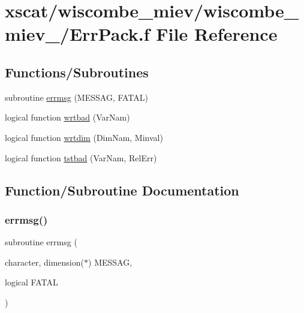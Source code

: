 \hypertarget{wiscombe__miev_2wiscombe__miev__1_2_err_pack_8f}{}\section{xscat/wiscombe\+\_\+miev/wiscombe\+\_\+miev\+\_/\+Err\+Pack.f File Reference}
\label{wiscombe__miev_2wiscombe__miev__1_2_err_pack_8f}
\subsection*{Functions/\+Subroutines}
\begin{DoxyCompactItemize}
\item 
subroutine \hyperlink{wiscombe__miev_2wiscombe__miev__1_2_err_pack_8f_a5b228fa8b6f6dd90e6de7beb661002ff}{errmsg} (M\+E\+S\+S\+AG, F\+A\+T\+AL)
\item 
logical function \hyperlink{wiscombe__miev_2wiscombe__miev__1_2_err_pack_8f_a39b9b11ebe066217c5eb36dda9009bab}{wrtbad} (Var\+Nam)
\item 
logical function \hyperlink{wiscombe__miev_2wiscombe__miev__1_2_err_pack_8f_ac00ea4bd5d2336abbbfaa44c3822eaad}{wrtdim} (Dim\+Nam, Minval)
\item 
logical function \hyperlink{wiscombe__miev_2wiscombe__miev__1_2_err_pack_8f_a17579d06a5cb7a305570f7082e20d81c}{tstbad} (Var\+Nam, Rel\+Err)
\end{DoxyCompactItemize}


\subsection{Function/\+Subroutine Documentation}
\mbox{\label{wiscombe__miev_2wiscombe__miev__1_2_err_pack_8f_a5b228fa8b6f6dd90e6de7beb661002ff}} 
\subsubsection{\texorpdfstring{errmsg()}{errmsg()}}
{\footnotesize\ttfamily subroutine errmsg (\begin{DoxyParamCaption}\item[{character, dimension($\ast$)}]{M\+E\+S\+S\+AG,  }\item[{logical}]{F\+A\+T\+AL }\end{DoxyParamCaption})}

